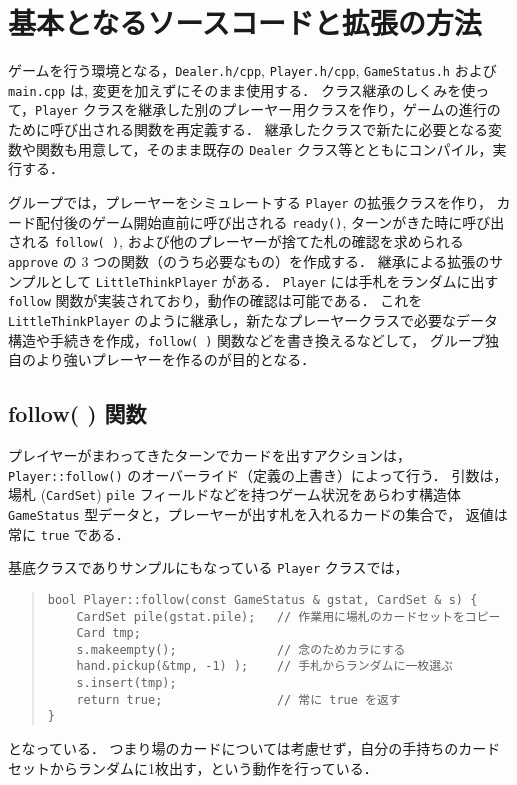 \section{基本となるソースコードと拡張の方法}
ゲームを行う環境となる，\verb+Dealer.h/cpp+, \verb+Player.h/cpp+, \verb+GameStatus.h+ および \verb+main.cpp+ は, 変更を加えずにそのまま使用する．
クラス継承のしくみを使って，\verb+Player+ クラスを継承した別のプレーヤー用クラスを作り，ゲームの進行のために呼び出される関数を再定義する．
継承したクラスで新たに必要となる変数や関数も用意して，そのまま既存の \verb+Dealer+ クラス等とともにコンパイル，実行する．

グループでは，プレーヤーをシミュレートする \verb+Player+ の拡張クラスを作り，
カード配付後のゲーム開始直前に呼び出される \verb+ready()+, ターンがきた時に呼び出される \verb+follow( )+, および他のプレーヤーが捨てた札の確認を求められる \verb+approve+ の 3 つの関数（のうち必要なもの）を作成する．
継承による拡張のサンプルとして \verb+LittleThinkPlayer+ がある．
\verb+Player+ には手札をランダムに出す \verb+follow+ 関数が実装されており，動作の確認は可能である．
これを \verb+LittleThinkPlayer+ のように継承し，新たなプレーヤークラスで必要なデータ構造や手続きを作成，\verb+follow( )+ 関数などを書き換えるなどして，
グループ独自のより強いプレーヤーを作るのが目的となる．

\subsection{follow( ) 関数}
プレイヤーがまわってきたターンでカードを出すアクションは，\verb+Player::follow()+ のオーバーライド（定義の上書き）によって行う．
引数は，場札 (\verb+CardSet+) \verb+pile+ フィールドなどを持つゲーム状況をあらわす構造体 \verb+GameStatus+ 型データと，プレーヤーが出す札を入れるカードの集合で，
返値は常に \verb+true+ である．

基底クラスでありサンプルにもなっている \verb+Player+ クラスでは，
\begin{quote}
\begin{verbatim}
bool Player::follow(const GameStatus & gstat, CardSet & s) {
    CardSet pile(gstat.pile);   // 作業用に場札のカードセットをコピー
    Card tmp;
    s.makeempty();              // 念のためカラにする
    hand.pickup(&tmp, -1) );    // 手札からランダムに一枚選ぶ
    s.insert(tmp);
    return true;                // 常に true を返す
}
\end{verbatim}
\end{quote}
となっている．
つまり場のカードについては考慮せず，自分の手持ちのカードセットからランダムに1枚出す，という動作を行っている．

